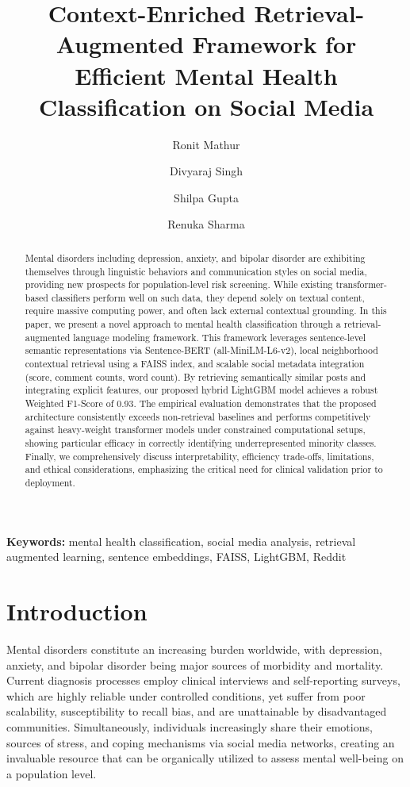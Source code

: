 \documentclass[11pt]{article}
\title{Context-Enriched Retrieval-Augmented Framework for Efficient Mental Health Classification on Social Media}
\author[1]{Ronit Mathur}
\author[2]{Divyaraj Singh}
\author[3]{Shilpa Gupta}
\author[4]{Renuka Sharma}
\affil[1,2,3,4]{Department of Computer Science, JIMS Engineering Management Technical Campus, Greater Noida, India}
\date{}
\begin{document}
\maketitle

\begin{abstract}
Mental disorders including depression, anxiety, and bipolar disorder are exhibiting themselves through linguistic behaviors and communication styles on social media, providing new prospects for population-level risk screening. While existing transformer-based classifiers perform well on such data, they depend solely on textual content, require massive computing power, and often lack external contextual grounding. In this paper, we present a novel approach to mental health classification through a retrieval-augmented language modeling framework. This framework leverages sentence-level semantic representations via Sentence-BERT (all-MiniLM-L6-v2), local neighborhood contextual retrieval using a FAISS index, and scalable social metadata integration (score, comment counts, word count). By retrieving semantically similar posts and integrating explicit features, our proposed hybrid LightGBM model achieves a robust Weighted F1-Score of 0.93. The empirical evaluation demonstrates that the proposed architecture consistently exceeds non-retrieval baselines and performs competitively against heavy-weight transformer models under constrained computational setups, showing particular efficacy in correctly identifying underrepresented minority classes. Finally, we comprehensively discuss interpretability, efficiency trade-offs, limitations, and ethical considerations, emphasizing the critical need for clinical validation prior to deployment.
\end{abstract}

\textbf{Keywords:} mental health classification, social media analysis, retrieval augmented learning, sentence embeddings, FAISS, LightGBM, Reddit

\section{Introduction}

Mental disorders constitute an increasing burden worldwide, with depression, anxiety, and bipolar disorder being major sources of morbidity and mortality. Current diagnosis processes employ clinical interviews and self-reporting surveys, which are highly reliable under controlled conditions, yet suffer from poor scalability, susceptibility to recall bias, and are unattainable by disadvantaged communities. Simultaneously, individuals increasingly share their emotions, sources of stress, and coping mechanisms via social media networks, creating an invaluable resource that can be organically utilized to assess mental well-being on a population level. 
\end{document}
